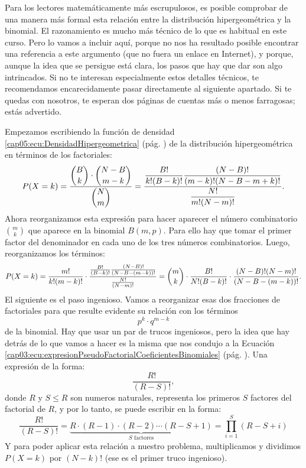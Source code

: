 Para los lectores matemáticamente más escrupulosos, es posible comprobar de una manera más formal esta relación entre la distribución hipergeométrica y la binomial. El razonamiento es mucho más técnico de lo que es habitual en este curso. Pero lo vamos a incluir aquí, porque no nos ha resultado posible encontrar una referencia a este argumento (que no fuera un enlace en Internet), y porque, aunque la idea que se persigue está clara, los pasos que hay que dar son algo intrincados. Si no te interesan especialmente estos detalles técnicos, te recomendamos encarecidamente pasar directamente al siguiente apartado. Si te quedas con nosotros, te esperan dos páginas de cuentas más o menos farragosas; estás advertido.

Empezamos escribiendo la función de densidad \ref{cap05:ecu:DensidadHipergeometrica} (pág. \pageref{cap05:ecu:DensidadHipergeometrica}) de la distribución hipergeométrica en términos de los factoriales:
\[
P(X=k)=\dfrac{\dbinom{B}{k}\cdot\dbinom{N-B}{m-k}}{\dbinom{N}{m}}=
\dfrac{
\dfrac{B!}{k!(B-k)!}\dfrac{(N-B)!}{(m-k)!(N-B-m+k)!}}{\dfrac{N!}{m!(N-m)!}}.
\]
Ahora reorganizamos esta expresión para hacer aparecer el número combinatorio $\binom{m}{k}$ que aparece en la binomial $B(m,p)$. Para ello hay que tomar el primer factor del denominador en cada uno de los tres números combinatorios. Luego, reorganizamos los términos:
\[
P(X=k)=\dfrac{m!}{k!(m-k)!}\cdot
\dfrac{
\frac{B!}{(B-k)!}\frac{(N-B)!}{(N-B-(m-k))!}}{\frac{N!}{(N-m)!}
}=
\dbinom{m}{k}\cdot
\frac{ B!}{N!(B-k)!}\cdot\frac{(N-B)!(N-m)!}{(N-B-(m-k))!}
.
\]
El siguiente es el paso ingenioso. Vamos a reorganizar esas dos fracciones de factoriales para que resulte evidente su relación con los términos
\[p^k\cdot q^{m-k}\]
de la binomial.  Hay que usar un par de trucos ingeniosos, pero la idea que hay detrás de lo que vamos a hacer es la misma que nos condujo a la Ecuación \ref{cap03:ecu:expresionPseudoFactorialCoeficientesBinomiales} (pág. \pageref{cap03:ecu:expresionPseudoFactorialCoeficientesBinomiales}). Una expresión de la forma:
\[\dfrac{R!}{(R-S)!},\]
donde $R$ y $S\leq R$ son numeros naturales, representa los primeros $S$ factores del factorial de $R$, y por lo tanto, se puede escribir en la forma:
\begin{equation}
\label{cap12:ecu:expresionPrimerosTerminosFactorial}
\dfrac{R!}{(R-S)!}=\underbrace{R\cdot(R-1)\cdot(R-2)\cdots(R-S+1)}_{S\mbox{ factores}}=
\prod_{i=1}^S (R-S+i)
\end{equation}
Y para poder aplicar esta relación a nuestro problema, multiplicamos y dividimos $P(X=k)$ por $(N-k)!$ (ese es el primer truco ingenioso).
